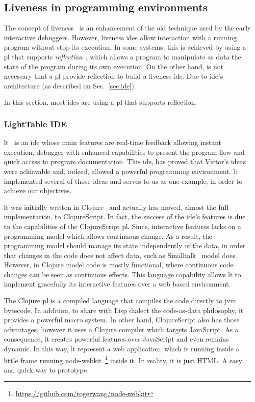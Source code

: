 \subsection{Liveness in programming environments}
\label{sec:liveness}
The concept of liveness~\cite{tanimoto2013perspective} is an enhancement of the old technique used by the early interactive debuggers. However, liveness \ac{ide}s allow interaction with a running program without stop its execution. In some systems, this is achieved by using a \ac{pl} that supports \textit{reflection}~\cite{bobrow1993clos}, which allows a program to manipulate as data the state of the program during its own execution. On the other hand, is not necessary that a \ac{pl} provide reflection to build a liveness \ac{ide}. Due to \ac{ide}'s architecture (as described on Sec.~\ref{sec:ide}).

In this section, most \ac{ide}s are using a \ac{pl} that supports reflection.

\subsubsection{LightTable IDE}
\label{sec:lt}

\ac{lt}~\cite{lighttable} is an \ac{ide} whose main features are real-time feedback allowing instant execution, debugger with enhanced capabilities to present the program flow and quick access to program documentation. This \ac{ide}, has proved that Victor's ideas~\cite{inventingPrin,learnableProg} were achievable and, indeed, allowed a powerful programming environment. \ac{lt} implemented several of those ideas and serves to us as one example, in order to achieve our objectives.

\ac{lt} was initially written in Clojure~\cite{hickey2008clojure} and actually has moved, almost the full implementation, to ClojureScript. In fact, the success of the \ac{ide}'s features is due to the capabilities of the ClojureScript \ac{pl}. Since, interactive features lacks on a programming model which allows continuous change. As a result, the programming model should manage its state independently of the data, in order that changes in the code does not affect data, such as Smalltalk~\cite{goldberg1983smalltalk} model does. However, in Clojure model code is mostly functional, where continuous code changes can be seen as continuous effects. This language capability allows \ac{lt} to implement gracefully its interactive features over a web based environment.

The Clojure \ac{pl} is a compiled language that compiles the code directly to \ac{jvm} bytecode. In addition, to share with Lisp dialect the code-as-data philosophy, it provides a powerful macro system. In other hand, ClojureScript also has those advantages, however it uses a Clojure compiler which targets JavaScript. As a consequence, it creates powerful features over JavaScript and even remains dynamic. In this way, \ac{lt} represent a web application, which is running inside a little frame running node-webkit~\footnote{\url{https://github.com/rogerwang/node-webkit}} inside it. In reality, it is just {\small HTML}. A easy and quick way to prototype.

